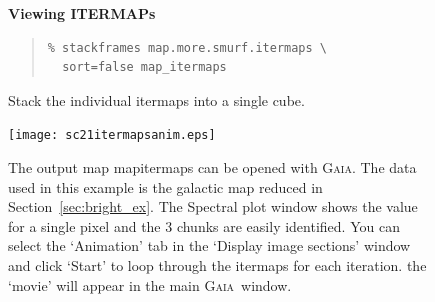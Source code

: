 \documentclass[twoside,11pt]{article}
\newenvironment{latexonly}{}{}
\newcommand{\xref}[3]{#1}
\renewcommand{\_}{\texttt{\symbol{95}}}
\newenvironment{fmpage}[1]{\begin{lrbox}{\fmbox}\begin{minipage}{#1}}{\end{minipage}\end{lrbox}\fbox{\usebox{\fmbox}}}
\newenvironment{myquote}{\begin{quote}\begin{small}}{\end{small}\end{quote}}
\newcommand{\gaia}{\xref{\textsc{Gaia}}{sun214}{}}
\begin{document}
\begin{latexonly}
\begin{figure}[ht!]
\begin{center}
\begin{fmpage}{0.95\linewidth}
\vspace{0.2cm}
\hspace{2mm}
\textbf{Viewing ITERMAPs}

\vspace{0.5cm}

\begin{minipage}[c]{0.65\linewidth}

\begin{myquote}
\begin{verbatim}
% stackframes map.more.smurf.itermaps \
  sort=false map_itermaps
\end{verbatim}
\end{myquote}
\end{minipage}
\hspace{0.3cm}
\begin{minipage}[c]{0.29\linewidth}
Stack the individual itermaps into a single cube.
\end{minipage}

\vspace{0.5cm}

\begin{minipage}[c]{0.65\linewidth}
\centering
\texttt{[image: sc21\_itermaps\_anim.eps]}

\end{minipage}
\hspace{0.3cm}
\begin{minipage}[c]{0.29\linewidth}
The output map map\_itermaps can be opened with \gaia. The data used
in this example is the galactic map reduced in
Section~\ref{sec:bright_ex}. The Spectral plot window shows the value
for a single pixel and the 3 chunks are easily identified. You can
select the `Animation' tab in the `Display image sections' window and
click `Start' to loop through the itermaps for each iteration. the
`movie' will appear in the main \gaia\ window.
\end{minipage}

\vspace{0.7cm}


\end{fmpage}
\end{center}
\end{figure}
\end{latexonly}
\end{document}
